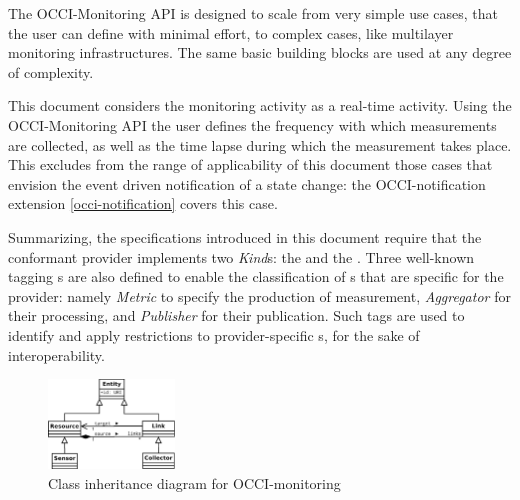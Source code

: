 \documentclass[10pt,a4paper]{article}
\begin{document}
The OCCI-Monitoring API is designed to scale from very simple use cases, that the user can define with minimal effort, to complex cases, like multilayer monitoring infrastructures. The same basic building blocks are used at any degree of complexity.



This document considers the monitoring activity as a real-time activity. Using the OCCI-Monitoring API the user defines the frequency with which measurements are collected, as well as the time lapse during which the measurement takes place. This excludes from the range of applicability of this document those cases that envision the event driven notification of a state change: the OCCI-notification extension \ref{occi-notification} covers this case.

Summarizing, the specifications introduced in this document require that the conformant provider implements two {\em Kind}s: the {\em \coll } and the {\em \sens }. Three well-known tagging \mi s are also defined to enable the classification of \mi s that are specific for the provider: namely {\em Metric} to specify the production of measurement, {\em Aggregator} for their processing, and {\em Publisher} for their publication. Such tags are used to identify and apply restrictions to provider-specific \mi s, for the sake of interoperability.

\begin{figure}
\centering
\includegraphics[width=0.3\textwidth]{figs/Monitoring_UML.pdf}
\caption{Class inheritance diagram for OCCI-monitoring}
\end{figure}
\end{document}
